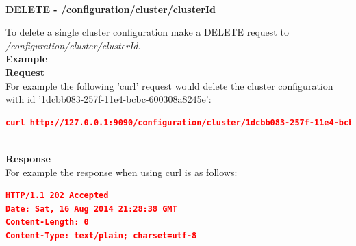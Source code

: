 \documentclass[a4paper,11pt,twoside]{article}
\begin{document}
\noindent \\
\textbf{DELETE - /configuration/cluster/{clusterId}}

\noindent 
To delete a single cluster configuration make a DELETE request to \textit{/configuration/cluster/{clusterId}}.\\

\noindent 
\textbf{Example}\\

\noindent 
\textbf{Request}\\

\noindent 
For example the following 'curl' request would delete the cluster configuration with id '1dcbb083-257f-11e4-bcbc-600308a8245e':\\

\begin{lstlisting}[language=json,firstnumber=1]
curl http://127.0.0.1:9090/configuration/cluster/1dcbb083-257f-11e4-bcbc-600308a8245e -X DELETE
\end{lstlisting}

\noindent \\
\textbf{Response}\\

\noindent 
For example the response when using curl is as follows:

\begin{lstlisting}[language=json,firstnumber=1]
HTTP/1.1 202 Accepted
Date: Sat, 16 Aug 2014 21:28:38 GMT
Content-Length: 0
Content-Type: text/plain; charset=utf-8
\end{lstlisting}
\end{document}
